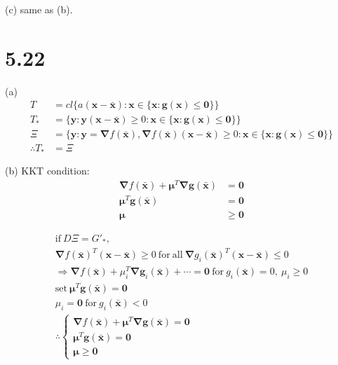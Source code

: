\documentclass[12pt]{article}
\begin{document}
(c) same as (b).
\section*{5.22}
(a)
\begin{align*}
    T&=cl\{ a(\bm x-\bm{\bar x}): \bm x\in \{\bm x : \bm g(\bm x)\le\bm 0\}\}\\
    T_*&=\{\bm y: \bm y(\bm x-\bm{\bar x})\ge0: \bm x\in \{\bm x : \bm g(\bm x)\le\bm 0\}\}
    \\
    \Xi&=\{\bm y: \bm y=\bm \nabla f(\bm{\bar x}), \bm \nabla f(\bm{\bar x})(\bm x-\bm{\bar x})\ge0: \bm x\in \{\bm x : \bm g(\bm x)\le\bm 0\}\}
    \\
    \therefore T_*&=\Xi
\end{align*}

(b)
KKT condition:
\begin{align*}
    \bm \nabla f(\bm{\bar x }) +\bm \mu^T \bm\nabla\bm  g(\bm{\bar x })
    &=\bm 0\\
    \bm \mu^T \bm  g(\bm {\bar x})&=\bm 0\\
    \bm \mu &\ge\bm 0
\end{align*}

\begin{align*}
    \mathrm{if\ }D\Xi= G'_*, \\
    \bm \nabla f(\bm{\bar x})^T\bm{( x-\bar x )}  \ge0 \mathrm{\ for\ all\ }
 \bm \nabla g_i(\bm{\bar x})^T    \bm{( x-\bar x )} \le0
   \\
\Rightarrow
\bm \nabla f(\bm{\bar x }) + \mu_i^T \bm\nabla\bm  g_i(\bm{\bar x })+\cdots
=\bm 0 
\mathrm{\ for \ } g_i(\bm{\bar x })=0,\ \mu_i\ge0\\
 \mathrm{set \ }   \bm \mu^T \bm  g(\bm {\bar x})=\bm 0\\
\mu_i=\bm 0 
\mathrm{\ for \ } g_i(\bm{\bar x })<0\\
\therefore
\begin{cases}
    \bm \nabla f(\bm{\bar x }) +\bm \mu^T \bm\nabla\bm  g(\bm{\bar x })
    =\bm 0\\
    \bm \mu^T \bm  g(\bm {\bar x})=\bm 0\\
    \bm \mu \ge\bm 0
\end{cases}
\end{align*}
\end{document}
